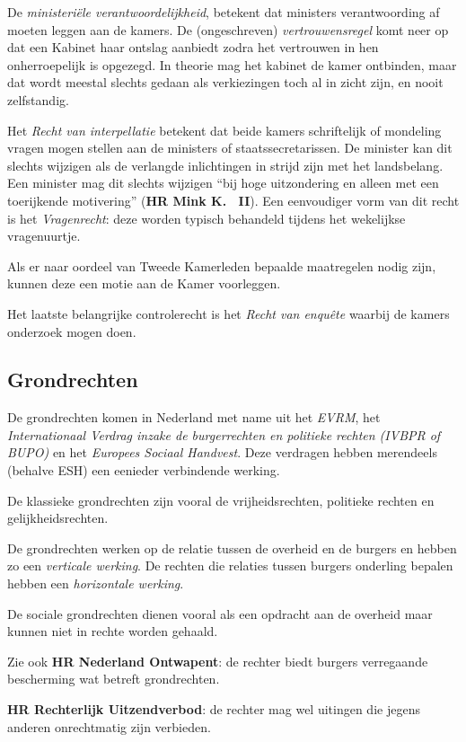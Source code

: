 \documentclass{article}
\begin{document}
De \emph{ministeri\"ele verantwoordelijkheid}, betekent dat ministers
verantwoording af moeten leggen aan de kamers. De (ongeschreven)
\emph{vertrouwensregel} komt neer op dat een Kabinet haar ontslag aanbiedt
zodra het vertrouwen in hen onherroepelijk is opgezegd. In theorie mag het
kabinet de kamer ontbinden, maar dat wordt meestal slechts gedaan als
verkiezingen toch al in zicht zijn, en nooit zelfstandig.

Het \emph{Recht van interpellatie} betekent dat beide kamers schriftelijk of
mondeling vragen mogen stellen aan de ministers of staatssecretarissen. De
minister kan dit slechts wijzigen als de verlangde inlichtingen in strijd zijn
met het landsbelang. Een minister mag dit slechts wijzigen ``bij hoge
uitzondering en alleen met een toerijkende motivering'' (\textbf{HR Mink K.~
II}). Een eenvoudiger vorm van dit recht is het \emph{Vragenrecht}: deze worden
typisch behandeld tijdens het wekelijkse vragenuurtje.

Als er naar oordeel van Tweede Kamerleden bepaalde maatregelen nodig zijn,
kunnen deze een motie aan de Kamer voorleggen.

Het laatste belangrijke controlerecht is het \emph{Recht van enqu\^ete} waarbij
de kamers onderzoek mogen doen.

\subsection{Grondrechten}

De grondrechten komen in Nederland met name uit het \emph{EVRM}, het
\emph{Internationaal Verdrag inzake de burgerrechten en politieke rechten
(IVBPR of BUPO)} en het \emph{Europees Sociaal Handvest}. Deze verdragen
hebben merendeels (behalve ESH) een eenieder verbindende werking.

De klassieke grondrechten zijn vooral de vrijheidsrechten, politieke rechten
en gelijkheidsrechten.

De grondrechten werken op de relatie tussen de overheid en de burgers en
hebben zo een \emph{verticale werking}. De rechten die relaties tussen
burgers onderling bepalen hebben een \emph{horizontale werking}.

De sociale grondrechten dienen vooral als een opdracht aan de overheid maar
kunnen niet in rechte worden gehaald.

Zie ook \textbf{HR Nederland Ontwapent}: de rechter biedt burgers verregaande
bescherming wat betreft grondrechten.

\textbf{HR Rechterlijk Uitzendverbod}: de rechter mag wel uitingen die jegens
anderen onrechtmatig zijn verbieden.
\end{document}
